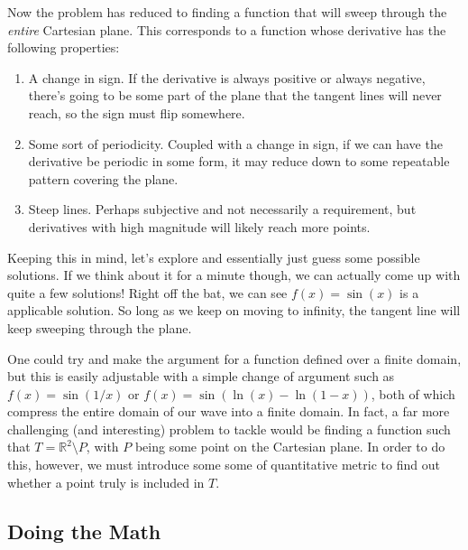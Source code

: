 Now  the problem has reduced to finding a function that
will sweep through the \textit{entire} Cartesian plane. This corresponds to a
function whose derivative has the following properties:

\begin{enumerate}
    \item A change in sign. If the derivative is always positive or always
    negative, there's going to be some part of the plane that the tangent
    lines will never reach, so the sign must flip somewhere.
    \item Some sort of periodicity. Coupled with a change in sign, if we can
    have the derivative be periodic in some form, it may reduce down to
    some repeatable pattern covering the plane.
    \item Steep lines. Perhaps subjective and not necessarily a requirement,
    but derivatives with high magnitude will likely reach more points.
\end{enumerate}

Keeping this in mind, let's explore and essentially just guess some possible
solutions. If we think about it for a minute though, we can actually come up
with quite a few solutions! Right off the bat, we can see \( f \left( x \right)
= \sin{\left( x \right)} \) is a applicable solution. So long as we keep on
moving to infinity, the tangent line will keep sweeping through the plane.

One could try and make the argument for a function defined over a finite
domain, but this is easily adjustable with a simple change of argument such as
\( f \left( x \right) = \sin{\left( 1/x \right)} \) or \( f \left( x \right) =
\sin{\left( \ln{\left( x \right)} - \ln{\left( 1 - x \right)} \right)} \), both
of which compress the entire domain of our wave into a finite domain. In fact,
a far more challenging (and interesting) problem to tackle would be finding a
function such that \( T = \mathbb{R}^2 \setminus P \), with \( P \) being some point
on the Cartesian plane. In order to do this, however, we must introduce some
some of quantitative metric to find out whether a point truly is included in \( T \).

\subsection{Doing the Math\texttrademark}

